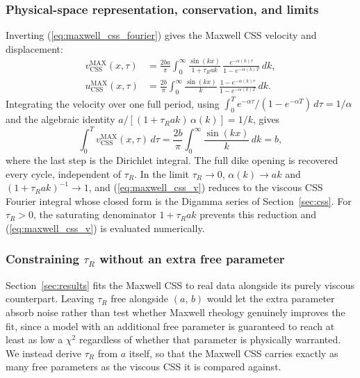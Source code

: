 \documentclass[extra]{gji}
\begin{document}
\subsubsection{Physical-space representation, conservation, and limits}

Inverting (\ref{eq:maxwell_css_fourier}) gives the Maxwell CSS velocity
and displacement:
\begin{align}
  v_{\text{CSS}}^{\text{MAX}}(x,\tau)
  &= \frac{2b a}{\pi}\int_0^{\infty}
     \frac{\sin(kx)}{1+\tau_R ak}\,
     \frac{e^{-\alpha(k)\tau}}{1-e^{-\alpha(k)T}}\,dk,
  \label{eq:maxwell_css_v} \\
  u_{\text{CSS}}^{\text{MAX}}(x,\tau)
  &= \frac{2b}{\pi}\int_0^{\infty}
     \frac{\sin(kx)}{k}\,
     \frac{1-e^{-\alpha(k)\tau}}{1-e^{-\alpha(k)T}}\,dk.
  \label{eq:maxwell_css_u}
\end{align}
Integrating the velocity over one full period, using
$\int_0^T e^{-\alpha\tau}/(1-e^{-\alpha T})\,d\tau = 1/\alpha$ and the
algebraic identity $a/[(1+\tau_R ak)\,\alpha(k)] = 1/k$, gives
\begin{equation}
  \int_0^T v_{\text{CSS}}^{\text{MAX}}(x,\tau)\,d\tau
  = \frac{2b}{\pi}\int_0^{\infty}
    \frac{\sin(kx)}{k}\,dk = b,
\end{equation}
where the last step is the Dirichlet integral.  The full dike opening
is recovered every cycle, independent of $\tau_R$.  In the limit
$\tau_R\to 0$, $\alpha(k)\to ak$ and $(1+\tau_R ak)^{-1}\to 1$, and
(\ref{eq:maxwell_css_v}) reduces to the viscous CSS Fourier integral whose
closed form is the Digamma series of Section~\ref{sec:css}.  For
$\tau_R > 0$, the saturating denominator $1+\tau_R ak$ prevents this
reduction and (\ref{eq:maxwell_css_v}) is evaluated numerically.

\subsubsection{Constraining $\tau_R$ without an extra free parameter}
\label{sec:tauR_shared}

Section~\ref{sec:results} fits the Maxwell CSS to real data alongside its
purely viscous counterpart.  Leaving $\tau_R$ free alongside $(a,\,b)$ would
let the extra parameter absorb noise rather than test whether Maxwell
rheology genuinely improves the fit, since a model with an additional free
parameter is guaranteed to reach at least as low a $\chi^2$ regardless of
whether that parameter is physically warranted.  We instead derive $\tau_R$
from $a$ itself, so that the Maxwell CSS carries exactly as many free
parameters as the viscous CSS it is compared against.
\end{document}
